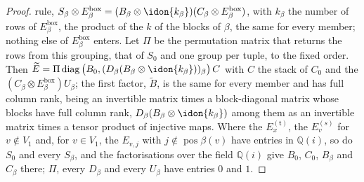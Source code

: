 \begin{proof}
rule, $S_{\beta}\otimes E^{\mathrm{box}}_{\beta}=(B_{\beta}\otimes
\idon{k_{\beta}})(C_{\beta}\otimes E^{\mathrm{box}}_{\beta})$, with
$k_{\beta}$ the number of rows of $E^{\mathrm{box}}_{\beta}$, the product of
the $k$ of the blocks of $\beta$, the same for every member; nothing else of
$E^{\mathrm{box}}_{\beta}$ enters. Let $\Pi$ be the permutation matrix that
returns the rows from this grouping, that of $S_0$ and one group per tuple,
to the fixed order. Then $\widetilde E=\Pi\operatorname{diag}\big(B_0,
(D_{\beta}(B_{\beta}\otimes\idon{k_{\beta}}))_{\beta}\big)\,C$ with $C$ the
stack of $C_0$ and the $(C_{\beta}\otimes E^{\mathrm{box}}_{\beta})U_{\beta}$;
the first factor, $\widetilde B$, is the same for every member and has full
column rank, being an invertible matrix times a block-diagonal matrix whose
blocks have full column rank, $D_{\beta}(B_{\beta}\otimes\idon{k_{\beta}})$
among them as an invertible matrix times a tensor product of injective maps.
Where the $E^{(\mathsf t)}_{x}$, the $E^{(s)}_v$ for $v\notin V_1$ and, for
$v\in V_1$, the $E_{v,j}$ with $j\notin\operatorname{pos}\beta(v)$ have
entries in $\mathbb{Q}(i)$, so do $S_0$ and every $S_{\beta}$, and the
factorisations over the field $\mathbb{Q}(i)$ give $B_0$, $C_0$, $B_{\beta}$
and $C_{\beta}$ there; $\Pi$, every $D_{\beta}$ and every $U_{\beta}$ have
entries $0$ and $1$.


\end{proof}
